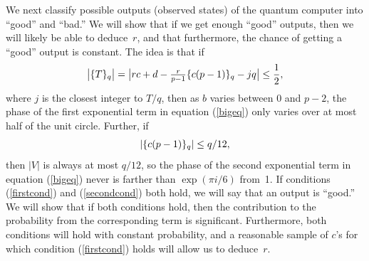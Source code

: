 We next classify possible outputs (observed states) of the quantum
computer into ``good'' and ``bad.''
We will show that if we get enough ``good'' outputs, then we will likely
be able to
deduce~$r$, and that furthermore, the chance of getting a ``good'' 
output is constant.  The idea is that if 
\begin{equation}
\big|{\{T\}_{q}}\big| =
\big| rc+d-{\textstyle \frac{r}{p-1}}{\{c(p-1)\}_{q}} -jq \big| 
\leq \frac{1}{2},
\label{firstcond}
\end{equation}
where $j$ is the closest integer to $ T/q $,
then as $b$ varies between 0 and $p-2$, the phase of 
the first exponential term in equation (\ref{bigeq}) only varies 
over at most half of the unit circle.  Further, if 
\begin{equation}
\left| {\{c(p-1)\}_{q}} \right| \leq q/12,
\label{secondcond}
\end{equation}
then $|V|$ is always at most $q/12$, so the phase of
the second exponential term in equation (\ref{bigeq}) never is farther than
$\exp(\pi i/ 6)$ from~1.  If conditions (\ref{firstcond}) and 
(\ref{secondcond}) both hold, we will say that an output is
``good.''  We will
show that if both conditions hold, then the contribution to the
probability from the corresponding term is significant.  Furthermore, 
both conditions will hold with constant probability, and
a reasonable sample of $c$'s for which condition (\ref{firstcond}) holds
will allow us to deduce~$r$.  

